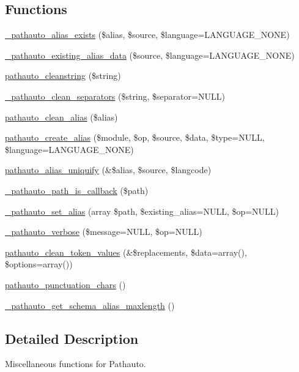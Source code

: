 \subsection*{Functions}
\begin{DoxyCompactItemize}
\item 
\hyperlink{pathauto_8inc_add7c5186fb921739f6cccd5cf2a2c82a}{\_\-pathauto\_\-alias\_\-exists} (\$alias, \$source, \$language=LANGUAGE\_\-NONE)
\item 
\hyperlink{pathauto_8inc_a4b36d2f45da703ece553f0d39f26d2b8}{\_\-pathauto\_\-existing\_\-alias\_\-data} (\$source, \$language=LANGUAGE\_\-NONE)
\item 
\hyperlink{pathauto_8inc_a0087774598dbc1a71658867d2275a3d1}{pathauto\_\-cleanstring} (\$string)
\item 
\hyperlink{pathauto_8inc_a84df3a794eb1448559c84aae690b4eb3}{\_\-pathauto\_\-clean\_\-separators} (\$string, \$separator=NULL)
\item 
\hyperlink{pathauto_8inc_a4a29b9c383bf47bb94f57e1602f847d9}{pathauto\_\-clean\_\-alias} (\$alias)
\item 
\hyperlink{pathauto_8inc_a7b68bec532634de11616779796a1fb7f}{pathauto\_\-create\_\-alias} (\$module, \$op, \$source, \$data, \$type=NULL, \$language=LANGUAGE\_\-NONE)
\item 
\hyperlink{pathauto_8inc_a997f76101702f48dd85c852ca2e91c3b}{pathauto\_\-alias\_\-uniquify} (\&\$alias, \$source, \$langcode)
\item 
\hyperlink{pathauto_8inc_a37f91c1fb2698d7280300505d2dcd55e}{\_\-pathauto\_\-path\_\-is\_\-callback} (\$path)
\item 
\hyperlink{pathauto_8inc_a954e5a5c442176c91e5a8fead004f9f1}{\_\-pathauto\_\-set\_\-alias} (array \$path, \$existing\_\-alias=NULL, \$op=NULL)
\item 
\hyperlink{pathauto_8inc_af1d110e621b254e3b2c925c824dd890a}{\_\-pathauto\_\-verbose} (\$message=NULL, \$op=NULL)
\item 
\hyperlink{pathauto_8inc_ab835bd3414c289c7a0a2fcbf38d6f13d}{pathauto\_\-clean\_\-token\_\-values} (\&\$replacements, \$data=array(), \$options=array())
\item 
\hyperlink{pathauto_8inc_a939a77c5a4177051307d62aad585b74e}{pathauto\_\-punctuation\_\-chars} ()
\item 
\hyperlink{pathauto_8inc_a9f709612633603049fcbd0c2f9b1ef09}{\_\-pathauto\_\-get\_\-schema\_\-alias\_\-maxlength} ()
\end{DoxyCompactItemize}


\subsection{Detailed Description}
Miscellaneous functions for Pathauto.

